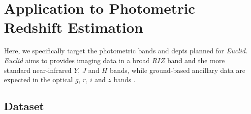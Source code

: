 \documentclass[useAMS,usenatbib,fleqn]{mn2e}
\begin{document}
\section{Application to Photometric Redshift Estimation}
\label{sec-application}

Here, we specifically target the photometric bands and depts planned for {\em Euclid}. {\em Euclid} aims to provides imaging data in a broad $RIZ$ band and the more standard near-infrared $Y$, $J$ and $H$ bands, while ground-based ancillary data are expected in the optical $g$, $r$, $i$ and $z$ bands \citep{laureijs2011}. 


\subsection{Dataset}
\label{sec-dataset}
\end{document}
